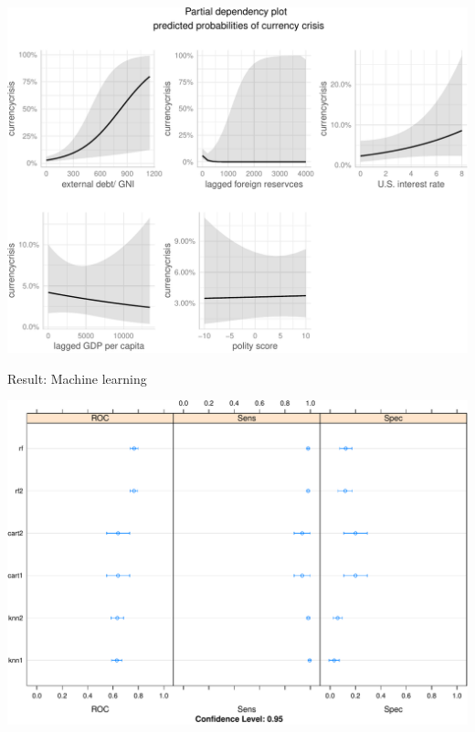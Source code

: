 \documentclass[ignorenonframetext,]{beamer}
\begin{document}
\begin{frame}

\begin{center}\includegraphics{beamer-pre_files/figure-beamer/unnamed-chunk-26-1} \end{center}

\end{frame}

\begin{frame}{Result: Machine learning}

\begin{center}\includegraphics{beamer-pre_files/figure-beamer/unnamed-chunk-54-1} \end{center}

\end{frame}
\end{document}
